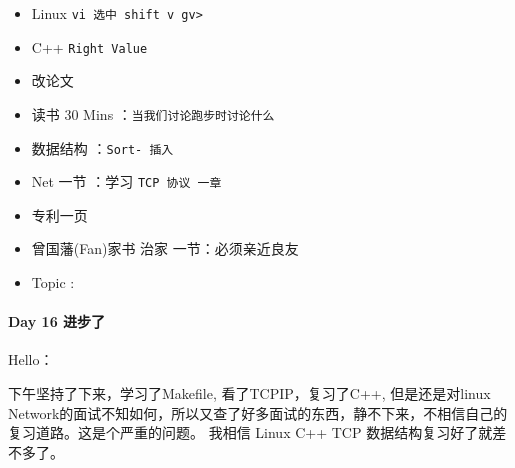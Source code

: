 \documentclass[UTF8,a4paper,8pt]{ctexart}
\begin{document}
		 \begin{itemize}[itemindent = 1em]
		 	\renewcommand\labelitemi{\makebox[0pt][l]{$\square$}\hspace{1em}} 
		 	\renewcommand\labelitemi{\makebox[0pt][l]{$\square$}\raisebox{.15ex}{\hspace{0.1em}$\checkmark$}}	 	
		 	\item   Linux \verb|vi 选中 shift v gv>|
		 	\item   C++   \verb|Right Value|
		 	\item   改论文
		 	
		 	\item   读书  30 Mins	：\verb|当我们讨论跑步时讨论什么|
		 	\item   数据结构 ：\verb|Sort- 插入|
		 	\item   Net 一节 ：学习 \verb|TCP 协议 一章|	
		 	\item   专利一页	
		 	\renewcommand\labelitemi{\makebox[0pt][l]{$\square$}\hspace{1em}} 
		 	
		 	
		 	\renewcommand\labelitemi{\makebox[0pt][l]{$\square$}\raisebox{.15ex}{\hspace{0.1em}$\checkmark$}}
		 	\item   曾国藩(Fan)家书 治家 一节：必须亲近良友
		 	\item   Topic :
		 \end{itemize}
 	 \paragraph{Day 16   进步了   \quad     }
	 	 Hello：
	 	 
	 	 下午坚持了下来，学习了Makefile, 看了TCPIP，复习了C++, 但是还是对linux Network的面试不知如何，所以又查了好多面试的东西，静不下来，不相信自己的复习道路。这是个严重的问题。 我相信 Linux C++  TCP 数据结构复习好了就差不多了。
	 	 
\end{document}
